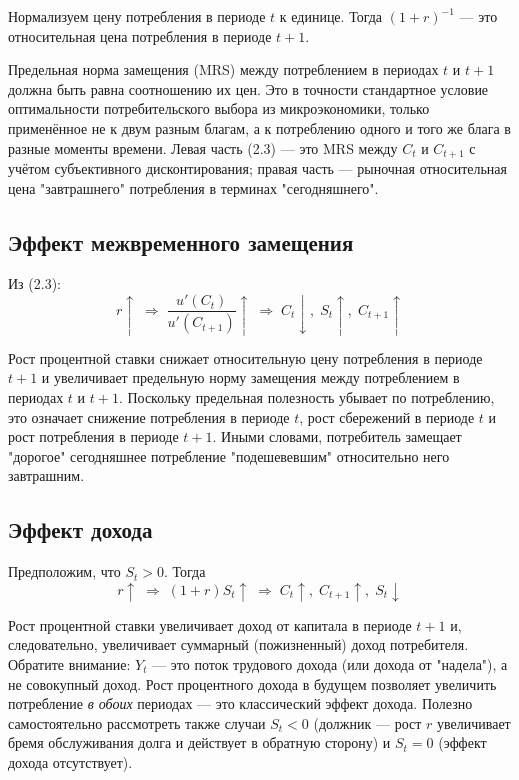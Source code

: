 \documentclass[10pt,a4paper]{article}
\begin{document}
Нормализуем цену потребления в периоде $t$ к единице. Тогда $(1+r)^{-1}$ — это относительная цена потребления в периоде $t+1$.
 
\begin{intuition}
Предельная норма замещения (MRS) между потреблением в периодах $t$ и $t+1$ должна быть равна соотношению их цен. Это в точности стандартное условие оптимальности потребительского выбора из микроэкономики, только применённое не к двум разным благам, а к потреблению одного и того же блага в разные моменты времени. Левая часть (2.3) — это MRS между $C_t$ и $C_{t+1}$ с учётом субъективного дисконтирования; правая часть — рыночная относительная цена "завтрашнего" потребления в терминах "сегодняшнего".
\end{intuition}
 
\subsection{Эффект межвременного замещения}
 
Из (2.3):
\[
r \uparrow \;\Rightarrow\; \frac{u'(C_t)}{u'(C_{t+1})} \uparrow \;\Rightarrow\; C_t \downarrow,\; S_t \uparrow,\; C_{t+1}\uparrow
\]
 
\begin{intuition}
Рост процентной ставки снижает относительную цену потребления в периоде $t+1$ и увеличивает предельную норму замещения между потреблением в периодах $t$ и $t+1$. Поскольку предельная полезность убывает по потреблению, это означает снижение потребления в периоде $t$, рост сбережений в периоде $t$ и рост потребления в периоде $t+1$. Иными словами, потребитель замещает "дорогое" сегодняшнее потребление "подешевевшим" относительно него завтрашним.
\end{intuition}
 
\subsection{Эффект дохода}
 
Предположим, что $S_t > 0$. Тогда
\[
r\uparrow \;\Rightarrow\; (1+r)S_t \uparrow \;\Rightarrow\; C_t \uparrow,\; C_{t+1}\uparrow,\; S_t\downarrow
\]
 
\begin{intuition}
Рост процентной ставки увеличивает доход от капитала в периоде $t+1$ и, следовательно, увеличивает суммарный (пожизненный) доход потребителя. Обратите внимание: $Y_t$ — это поток трудового дохода (или дохода от "надела"), а не совокупный доход. Рост процентного дохода в будущем позволяет увеличить потребление \emph{в обоих} периодах — это классический эффект дохода. Полезно самостоятельно рассмотреть также случаи $S_t < 0$ (должник — рост $r$ увеличивает бремя обслуживания долга и действует в обратную сторону) и $S_t = 0$ (эффект дохода отсутствует).
\end{intuition}
 
\end{document}
